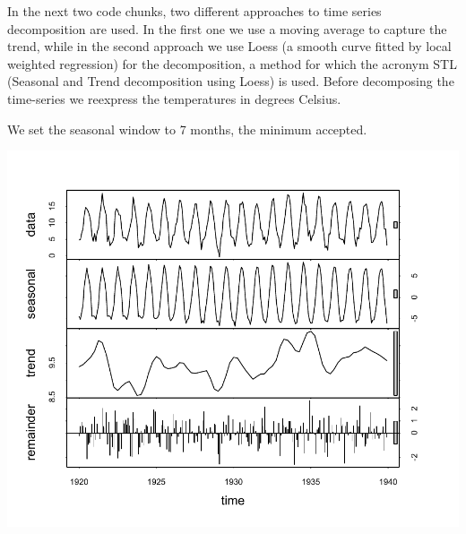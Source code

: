 \documentclass[krantz2]{krantz}\usepackage{knitr}
\begin{document}
In the next two code chunks, two different approaches to time series decomposition are used. In the first one we use a moving average to capture the trend, while in the second approach we use Loess (a smooth curve fitted by local weighted regression) for the decomposition, a method for which the acronym STL (Seasonal and Trend decomposition using Loess) is used. Before decomposing the time-series we reexpress the temperatures in degrees Celsius.

\begin{knitrout}\footnotesize
{}\color{fgcolor}\begin{kframe}
\begin{alltt}
 \hlkwb{<-}  \hlopt{-} \hlstd{)} \hlopt{*} \hlopt{/}
\end{alltt}
\end{kframe}
\end{knitrout}

We set the seasonal window to 7 months, the minimum accepted.


\begin{knitrout}\footnotesize
{}\color{fgcolor}\begin{kframe}
\begin{alltt}
 \hlkwb{<-}   \hlstd{=} \hlstd{)}
\end{alltt}
\end{kframe}

{\centering \includegraphics[width=.7\textwidth]{figure/pos-ts-05-1} 

}


\end{knitrout}
\end{document}
